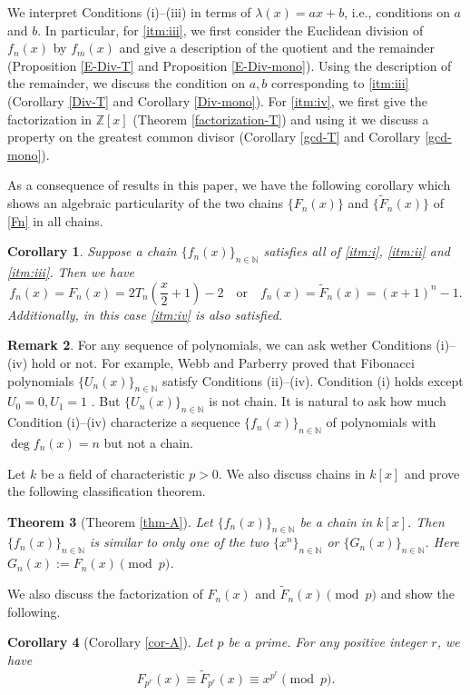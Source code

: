 \documentclass[a4paper, 11pt]{amsart}
\numberwithin{equation}{section}
\newtheorem{thm}{Theorem}[section]
\newtheorem{cor}[thm]{Corollary}
\theoremstyle{definition}
\newtheorem{rmk}[thm]{Remark}
\newcommand{\Z}{\mathbb{Z}}
\newcommand{\N}{\mathbb{N}}
\begin{document}
 We interpret Conditions (i)--(iii) in terms of $\lambda(x)=ax+b$, i.e., conditions on $a$ and $b$.
 In particular, for \ref{itm:iii}, we first consider the Euclidean division of $f_n(x)$ by $f_m(x)$ and give a description of the quotient and the remainder (Proposition \ref{E-Div-T} and Proposition \ref{E-Div-mono}).
Using the description of the remainder, we discuss the condition on $a, b$ corresponding to \ref{itm:iii} (Corollary \ref{Div-T} and Corollary \ref{Div-mono}).
For \ref{itm:iv}, we first give the factorization in $\Z[x]$ (Theorem \ref{factorization-T}) and using it we discuss a property on the greatest common divisor (Corollary \ref{gcd-T} and Corollary \ref{gcd-mono}).


As a consequence of results in this paper, we have the following corollary which shows an algebraic particularity of the two chains $\{F_n(x)\}$ and $\{\tilde{F}_n(x)\}$ of \eqref{Fn} in all chains.

\begin{cor}\label{intro-consequence}
Suppose a chain $\{f_n(x)\}_{n \in \N}$ satisfies all of \ref{itm:i}, \ref{itm:ii} and \ref{itm:iii}.
Then we have
\[
f_n(x)=F_n(x)=2T_n\left(\frac{x}2+1\right)-2\quad \text{or}\quad f_n(x)=\tilde{F}_n(x)=(x+1)^n-1.
\]
Additionally, in this case \ref{itm:iv} is also satisfied. 
\end{cor}

\begin{rmk}
For any sequence of polynomials, we can ask wether Conditions (i)--(iv) hold or not.
For example, Webb and Parberry \cite{WP} proved that Fibonacci polynomials $\{U_n(x)\}_{n\in\N}$ satisfy Conditions (ii)--(iv).
Condition (i) holds except $U_0=0, U_1=1$ .
But $\{U_n(x)\}_{n\in\N}$ is not chain.
It is natural to ask how much Condition (i)--(iv) characterize a sequence $\{f_n(x)\}_{n\in \N}$ of polynomials with $\deg f_n(x)=n$ but not a chain.
\end{rmk}

Let $k$ be a field of characteristic $p>0$.
We also discuss chains in $k[x]$ and prove the following classification theorem. 
\begin{thm}[Theorem \ref{thm-A}]\label{intro-thm-A}
Let $\{f_n(x)\}_{n \in \N}$ be a chain in $k[x]$.
Then $\{f_n(x)\}_{n \in \N}$ is similar to only one of the two $\{ x^n\}_{n\in\N}$ or $\{G_n(x)\}_{n\in\N}$.
Here $G_n(x):=F_n(x) \pmod p$.
\end{thm}

We also discuss the factorization of $F_n(x)$ and $\tilde{F}_n(x)\pmod p$ and show the following.
\begin{cor}[Corollary \ref{cor-A}]\label{intro-cor-A}
Let $p$ be a prime.
For any positive integer $r$, we have
\[
F_{p^r}(x)\equiv \tilde{F}_{p^r}(x)\equiv x^{p^r}\pmod p.
\]
\end{cor}
\end{document}
